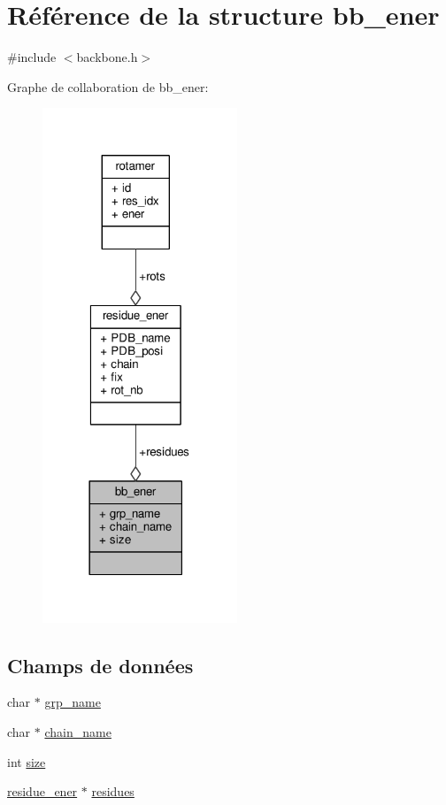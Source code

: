 \hypertarget{structbb__ener}{\section{Référence de la structure bb\+\_\+ener}
\label{structbb__ener}
}


{\ttfamily \#include $<$backbone.\+h$>$}



Graphe de collaboration de bb\+\_\+ener\+:\nopagebreak
\begin{figure}[H]
\begin{center}
\leavevmode
\includegraphics[width=165pt]{structbb__ener__coll__graph}
\end{center}
\end{figure}
\subsection*{Champs de données}
\begin{DoxyCompactItemize}
\item 
char $\ast$ \hyperlink{structbb__ener_a0bdd0dade60d496d91110f355912c3b2}{grp\+\_\+name}
\item 
char $\ast$ \hyperlink{structbb__ener_ae278605bdc31a3f2d9b6a78b6818ccc7}{chain\+\_\+name}
\item 
int \hyperlink{structbb__ener_a3b5d8e5f4c32f990a1b7a87c95ae74e2}{size}
\item 
\hyperlink{structresidue__ener}{residue\+\_\+ener} $\ast$ \hyperlink{structbb__ener_abc8f47b185def941f8f68fefd38eb628}{residues}
\end{DoxyCompactItemize}


